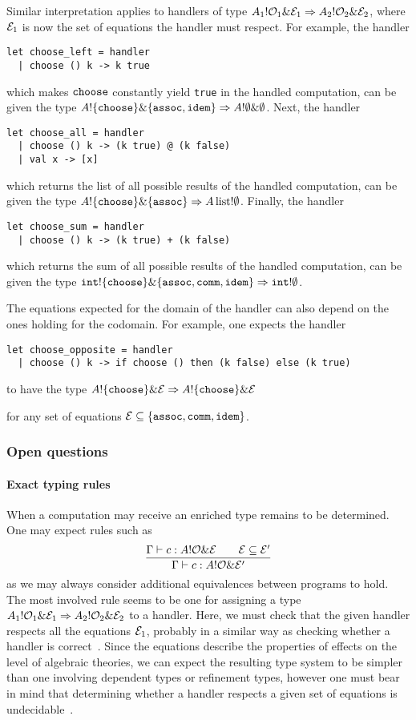 \documentclass[a4paper,UKenglish]{dagrep}
\begin{document}
Similar interpretation applies to handlers of type $A_1 ! \mathcal{O}_1 \& \mathcal{E}_1 \Rightarrow A_2 ! \mathcal{O}_2 \& \mathcal{E}_2$, where $\mathcal{E}_1$ is now the set of equations the handler must respect. For example, the handler
%
\begin{verbatim}
let choose_left = handler
  | choose () k -> k true
\end{verbatim}
%
which makes $\mathtt{choose}$ constantly yield \verb|true| in the handled computation,
can be given the type $A ! \{ \mathtt{choose} \} \& \{ \mathtt{assoc}, \mathtt{idem} \} \Rightarrow A ! \emptyset \& \emptyset$.
Next, the handler
%
\begin{verbatim}
let choose_all = handler
  | choose () k -> (k true) @ (k false)
  | val x -> [x]
\end{verbatim}
%
which returns the list of all possible results of the handled computation,
can be given the type $A ! \{ \mathtt{choose} \} \& \{ \mathtt{assoc} \} \Rightarrow A \, \mathrm{list} ! \emptyset$.
Finally, the handler
%
\begin{verbatim}
let choose_sum = handler
  | choose () k -> (k true) + (k false)
\end{verbatim}
%
which returns the sum of all possible results of the handled computation,
can be given the type $\mathtt{int} ! \{ \mathtt{choose} \} \& \{ \mathtt{assoc}, \mathtt{comm}, \mathtt{idem} \} \Rightarrow \mathtt{int} ! \emptyset$.

The equations expected for the domain of the handler can also depend on the ones
holding for the codomain. For example, one expects the handler
%
\begin{verbatim}
let choose_opposite = handler
  | choose () k -> if choose () then (k false) else (k true)
\end{verbatim}
%
to have the type \quad $A ! \{ \mathtt{choose} \} \& \mathcal{E} \Rightarrow A ! \{ \mathtt{choose} \} \& \mathcal{E}$

\noindent for any set of equations ${\mathcal{E} \subseteq \{ \mathtt{assoc}, \mathtt{comm}, \mathtt{idem} \}}$.

\subsubsection*{Open questions}

\paragraph*{Exact typing rules}
When a computation may receive an enriched type remains to be determined. One may expect rules such as
\[
  \frac{\Gamma \vdash c : A ! \mathcal{O} \& \mathcal{E} \qquad \mathcal{E} \subseteq \mathcal{E}'}{\Gamma \vdash c : A ! \mathcal{O} \& \mathcal{E}'}
\]
as we may always consider additional equivalences between programs to hold. The most involved rule seems to be one for assigning a type $A_1 ! \mathcal{O}_1 \& \mathcal{E}_1 \Rightarrow A_2 ! \mathcal{O}_2 \& \mathcal{E}_2$ to a handler. Here, we must check that the given handler respects all the equations $\mathcal{E}_1$, probably in a similar way as checking whether a handler is correct~\cite{DBLP:journals/corr/PlotkinP13}. Since the equations describe the properties of effects on the level of algebraic theories, we can expect the resulting type system to be simpler than one involving dependent types or refinement types, however one must bear in mind that determining whether a handler respects a given set of equations is undecidable~\cite{DBLP:journals/corr/PlotkinP13}.
\end{document}
